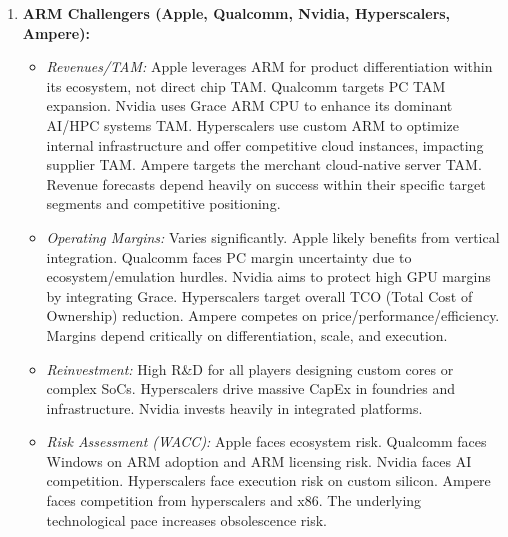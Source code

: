 \begin{enumerate}
    \item \textbf{ARM Challengers (Apple, Qualcomm, Nvidia, Hyperscalers, Ampere):}
          \begin{itemize}
              \item \textit{Revenues/TAM:} Apple leverages ARM for product differentiation within its ecosystem, not direct chip TAM. Qualcomm targets PC TAM expansion. Nvidia uses Grace ARM CPU to enhance its dominant AI/HPC systems TAM. Hyperscalers use custom ARM to optimize internal infrastructure and offer competitive cloud instances, impacting supplier TAM. Ampere targets the merchant cloud-native server TAM. Revenue forecasts depend heavily on success within their specific target segments and competitive positioning.
              \item \textit{Operating Margins:} Varies significantly. Apple likely benefits from vertical integration. Qualcomm faces PC margin uncertainty due to ecosystem/emulation hurdles. Nvidia aims to protect high GPU margins by integrating Grace. Hyperscalers target overall TCO (Total Cost of Ownership) reduction. Ampere competes on price/performance/efficiency. Margins depend critically on differentiation, scale, and execution.
              \item \textit{Reinvestment:} High R\&D for all players designing custom cores or complex SoCs. Hyperscalers drive massive CapEx in foundries and infrastructure. Nvidia invests heavily in integrated platforms.
              \item \textit{Risk Assessment (WACC):} Apple faces ecosystem risk. Qualcomm faces Windows on ARM adoption and ARM licensing risk. Nvidia faces AI competition. Hyperscalers face execution risk on custom silicon. Ampere faces competition from hyperscalers and x86. The underlying technological pace increases obsolescence risk.
          \end{itemize}


\end{enumerate}
